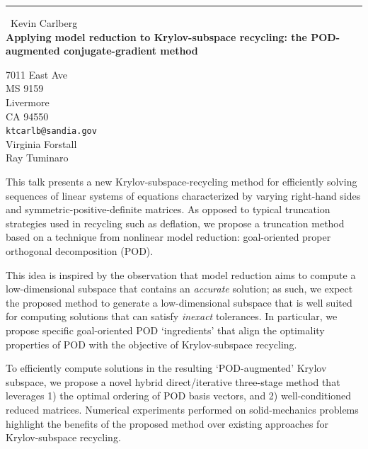\documentclass{report}
\begin{document}
\begin{center}
\rule{6in}{1pt} \
{\large Kevin Carlberg \\
{\bf Applying model reduction to Krylov-subspace recycling: the POD-augmented conjugate-gradient method}}

7011 East Ave \\ MS 9159 \\ Livermore \\ CA 94550
\\
{\tt ktcarlb@sandia.gov}\\
Virginia Forstall\\
Ray Tuminaro\end{center}

This talk presents a new Krylov-subspace-recycling method for efficiently
solving sequences of linear systems of equations characterized by varying
right-hand sides and symmetric-positive-definite matrices. As opposed to
typical truncation strategies used in recycling such as deflation, we propose
a truncation method based on a technique from nonlinear model reduction:
goal-oriented proper orthogonal decomposition (POD).

This idea is inspired by the observation that model reduction aims to compute a
low-dimensional subspace that contains an \textit{accurate} solution; as such,
we expect the proposed method to generate a low-dimensional subspace that is
well suited for computing solutions that can satisfy \textit{inexact}
tolerances. In particular, we propose specific goal-oriented POD `ingredients'
that align the optimality properties of POD with the objective of
Krylov-subspace recycling.

To efficiently compute solutions in the resulting `POD-augmented' Krylov
subspace, we propose a novel hybrid direct/iterative three-stage method that
leverages 1) the optimal ordering of POD basis vectors, and 2)
well-conditioned reduced matrices. Numerical experiments performed on
solid-mechanics problems highlight the benefits of the proposed method over
existing approaches for Krylov-subspace recycling.
\end{document}

